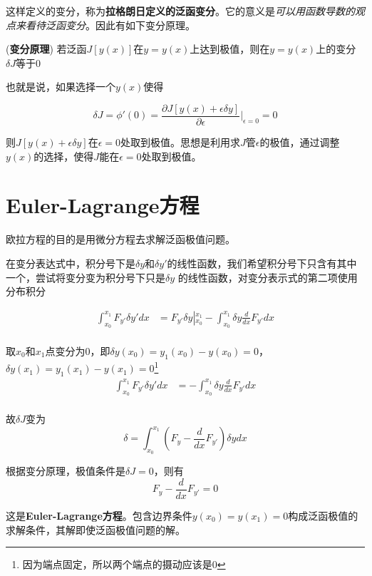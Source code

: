 这样定义的变分，称为\textbf{拉格朗日定义的泛函变分}。它的意义是\textsl{可以用函数导数的观点来看待泛函变分}。因此有如下变分原理。

\begin{framed}
    \begin{theorem}(\textbf{变分原理})
        若泛函$J[y(x)]$在$y=y(x)$上达到极值，则在$y=y(x)$上的变分$\delta J$等于0
    \end{theorem}
\end{framed}

也就是说，如果选择一个$y(x)$使得

\begin{equation}
    \delta J=\phi'(0)=\frac{\partial J[y(x)+\epsilon\delta y]}{\partial \epsilon}\vert_{\epsilon=0}=0
\end{equation}

则$J[y(x)+\epsilon\delta y]$在$\epsilon=0$处取到极值。思想是利用求$J$管$\epsilon$的极值，通过调整$y(x)$的选择，使得$J$能在$\epsilon=0$处取到极值。

\section{Euler-Lagrange方程}

欧拉方程的目的是用微分方程去求解泛函极值问题。

在变分表达式中，积分号下是$\delta y$和$\delta y'$的线性函数，我们希望积分号下只含有其中一个，尝试将变分变为积分号下只是$\delta y$
的线性函数，对变分表示式的第二项使用分布积分

\begin{equation}
    \begin{aligned}
        \int_{x_0}^{x_1}F_{y'}\delta y'dx&=F_{y'}\delta y\left|^{x_1}_{x_0}\right.-\int_{x_0}^{x_1}\delta y\frac{d}{dx}F_{y'}dx\\
    \end{aligned}
\end{equation}

取$x_0$和$x_1$点变分为0，即$\delta y(x_0)=y_1(x_0)-y(x_0)=0$，$\delta y(x_1)=y_1(x_1)-y(x_1)=0$\footnote{因为端点固定，所以两个端点的摄动应该是0}
\begin{equation}
    \begin{aligned}
        \int_{x_0}^{x_1}F_{y'}\delta y'dx&=-\int_{x_0}^{x_1}\delta y\frac{d}{dx}F_{y'}dx\\
    \end{aligned}
\end{equation}

故$\delta J$变为
\begin{equation}
    \delta =\int_{x_0}^{x_1}(F_{y}-\frac{d}{dx}F_{y'})\delta ydx
\end{equation}

根据变分原理，极值条件是$\delta J=0$，则有
\begin{equation}
    F_y-\frac{d}{dx}F_{y'}=0
\end{equation}

这是\textbf{Euler-Lagrange方程}。包含边界条件$y(x_0)=y(x_1)=0$构成泛函极值的求解条件，其解即使泛函极值问题的解。
